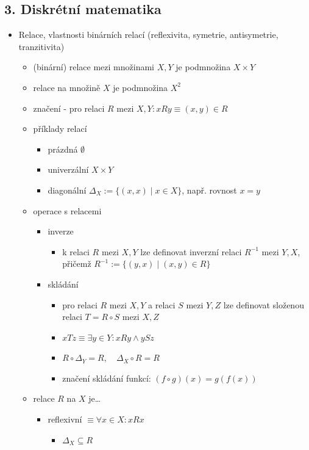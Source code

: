 \subsection{3. Diskrétní matematika}
\begin{itemize}
\item Relace, vlastnosti binárních relací (reflexivita, symetrie, antisymetrie, tranzitivita)
\begin{itemize}
\item (binární) relace mezi množinami $X,Y$ je podmnožina $X\times Y$
\item relace na množině $X$ je podmnožina $X^2$
\item značení - pro relaci $R$ mezi $X,Y:xRy \equiv (x,y)\in R$
\item příklady relací
\begin{itemize}
\item prázdná $\emptyset$
\item univerzální $X\times Y$
\item diagonální $\Delta_X := \lbrace (x,x)\mid x\in X\rbrace$, např. rovnost $x=y$
\end{itemize}
\item operace s relacemi
\begin{itemize}
\item inverze
\begin{itemize}
\item k relaci $R$ mezi $X,Y$ lze definovat inverzní relaci $R^{-1}$ mezi $Y,X$, přičemž $R^{-1} := \lbrace(y,x)\mid (x,y)\in R\rbrace$
\end{itemize}
\item skládání
\begin{itemize}
\item pro relaci $R$ mezi $X,Y$ a relaci $S$ mezi $Y,Z$ lze definovat složenou relaci $T=R\circ S$ mezi $X,Z$
\item $xTz \equiv \exists y \in Y: xRy \land ySz$
\item $R\circ \Delta_Y =R,\quad \Delta_X\circ R = R$
\item značení skládání funkcí: $(f\circ g)(x)=g(f(x))$
\end{itemize}
\end{itemize}
\item relace $R$ na $X$ je\dots{}
\begin{itemize}
\item reflexivní $\equiv \forall x \in X: xRx$
\begin{itemize}
\item $\Delta_X \subseteq R$

\end{itemize}
\end{itemize}
\end{itemize}
\end{itemize}
